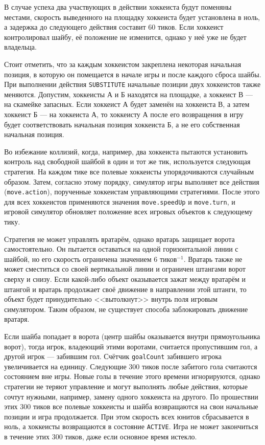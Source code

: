 \begin{itemize}
\begin{itemize}
          В случае успеха два участвующих в действии хоккеиста будут поменяны местами, скорость выведенного на площадку хоккеиста будет
          установлена в ноль, а задержка до следующего действия составит $60$ тиков. Если хоккеист контролировал шайбу, её положение не
          изменится, однако у неё уже не будет владельца.

          Стоит отметить, что за каждым хоккеистом закреплена некоторая начальная позиция, в которую он помещается в начале игры и после
          каждого сброса шайбы. При выполнении действия \texttt{SUBSTITUTE} начальные позиции двух хоккеистов также меняются. Допустим,
          хоккеисты $А$ и $Б$ находятся на площадке, а хоккеист $В$ --- на скамейке запасных. Если хоккеист $А$ будет заменён на хоккеиста
          $В$, а затем хоккеист $Б$ --- на хоккеиста $А$, то хоккеисту $А$ после его возвращения в игру будет соответствовать начальная
          позиция хоккеиста $Б$, а не его собственная начальная позиция.
  \end{itemize}
\end{itemize}

Во избежание коллизий, когда, например, два хоккеиста пытаются установить контроль над свободной шайбой в один и тот же тик, используется
следующая стратегия. На каждом тике все полевые хоккеисты упорядочиваются случайным образом. Затем, согласно этому порядку, симулятор игры
выполняет все действия (\texttt{move.action}), порученные хоккеистам управляющими стратегиями. После этого для всех хоккеистов применяются
значения \texttt{move.speedUp} и \texttt{move.turn}, и игровой симулятор обновляет положение всех игровых объектов к следующему тику.

Стратегия не может управлять вратарём, однако вратарь защищает ворота самостоятельно. Он пытается оставаться на одной горизонтальной линии
с шайбой, но его скорость ограничена значением $6$ тиков$^{-1}$. Вратарь также не может сместиться со своей вертикальной линии и ограничен
штангами ворот сверху и снизу. Если какой-либо объект оказывается зажат между вратарём и штангой и вратарь продолжает своё движение в
направлении этой штанги, то объект будет принудительно <<вытолкнут>> внутрь поля игровым симулятором. Таким образом, не существует способа
заблокировать движение вратаря.

Если шайба попадает в ворота (центр шайбы оказывается внутри прямоугольника ворот), тогда игрок, владеющий этими воротами, считается
пропустившим гол, а другой игрок --- забившим гол. Счётчик \texttt{goalCount} забившего игрока увеличивается на единицу. Следующие $300$
тиков после забитого гола считаются состоянием вне игры. Новые голы в течение этого времени игнорируются, однако стратегии не теряют
управление и могут выполнять любые действия, которые сочтут нужными, например, замену одного хоккеиста на другого. По прошествии этих $300$
тиков все полевые хоккеисты и шайба возвращаются на свои начальные позиции и игра продолжается. При этом скорость всех юнитов сбрасывается
в ноль, а хоккеисты возвращаются в состояние \texttt{ACTIVE}. Игра не может закончиться в течение этих $300$ тиков, даже если основное время
истекло.

